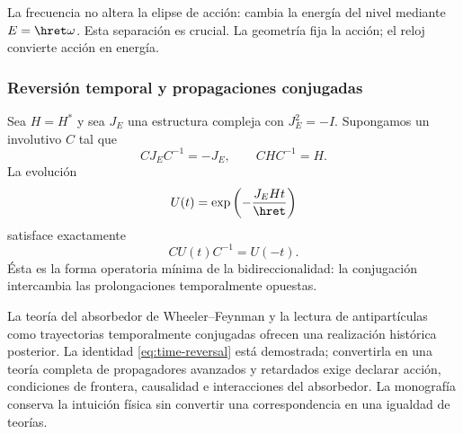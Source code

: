 La frecuencia no altera la elipse de acción: cambia la energía del nivel
mediante \(E=\hret\omega\). Esta separación es crucial. La geometría fija la
acción; el reloj convierte acción en energía.

\subsubsection{Reversión temporal y propagaciones conjugadas}

Sea \(H=H^*\) y sea \(J_E\) una estructura compleja con \(J_E^2=-I\).
Supongamos un involutivo \(C\) tal que
\[
CJ_EC^{-1}=-J_E,\qquad CHC^{-1}=H.
\]
La evolución
\begin{equation}
U(t)=\exp\left(-\frac{J_EHt}{\hret}\right)
\label{eq:evolution-J}
\end{equation}
satisface exactamente
\begin{equation}
CU(t)C^{-1}=U(-t).
\label{eq:time-reversal}
\end{equation}
Ésta es la forma operatoria mínima de la bidireccionalidad: la conjugación
intercambia las prolongaciones temporalmente opuestas.

La teoría del absorbedor de Wheeler--Feynman y la lectura de antipartículas
como trayectorias temporalmente conjugadas ofrecen una realización histórica
posterior. La identidad \eqref{eq:time-reversal} está demostrada; convertirla
en una teoría completa de propagadores avanzados y retardados exige declarar
acción, condiciones de frontera, causalidad e interacciones del absorbedor.
La monografía conserva la intuición física sin convertir una correspondencia
en una igualdad de teorías.

